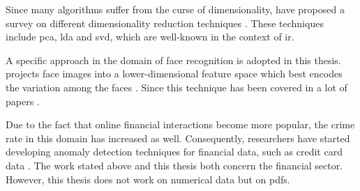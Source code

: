 Since many algorithms suffer from the curse of dimensionality, \citeauthor{dim_reduction2021} have proposed a survey on different dimensionality reduction techniques \cite{dim_reduction2021}.
These techniques include \ac{pca}, \ac{lda} and \ac{svd}, which are well-known in the context of \ac{ir}.


A specific approach in the domain of face recognition is adopted in this thesis.
\eigenfaces{} projects face images into a lower-dimensional feature space which best encodes the variation among the faces \cite{eigenfaces1991}.
Since \citeyear{eigenfaces1991} this technique has been covered in a lot of papers 
\cite{eigenfaces1991, eigenfaces1997, eigenfaces2013, face-recognition2008, face-recognition2020, face-recognition2021}.

Due to the fact that online financial interactions become more popular, the crime rate in this domain has increased as well.
Consequently, researchers have started developing anomaly detection techniques for financial data, such as credit card data 
\cite{credit_f_SOM2006, fd_ARIMA2021, cf_AE2020, AE_RF2021, dt_svm_2012, kaggle_ex2017}.
The work stated above and this thesis both concern the financial sector.
However, this thesis does not work on numerical data but on \acp{pdf}.